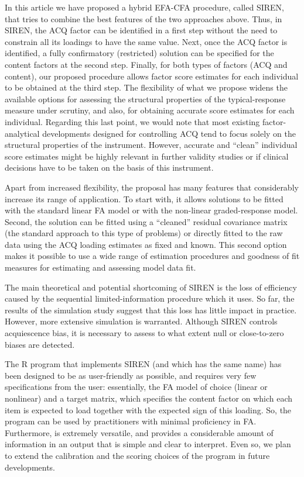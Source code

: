 In this article we have proposed a hybrid EFA-CFA procedure, called SIREN, that tries to combine the best features of the two approaches above. Thus, in SIREN, the ACQ factor can be identified in a first step without the need to constrain all its loadings to have the same value. Next, once the ACQ factor is identified, a fully confirmatory (restricted) solution can be specified for the content factors at the second step. Finally, for both types of factors (ACQ and content), our proposed procedure allows factor score estimates for each individual to be obtained at the third step. The flexibility of what we propose widens the available options for assessing the structural properties of the typical-response measure under scrutiny, and also, for obtaining accurate score estimates for each individual. Regarding this last point, we would note that most existing factor-analytical developments designed for controlling ACQ tend to focus solely on the structural properties of the instrument. However, accurate and “clean” individual score estimates might be highly relevant in further validity studies or if clinical decisions have to be taken on the basis of this instrument.

Apart from increased flexibility, the proposal has many features that considerably increase its range of application. To start with, it allows solutions to be fitted with the standard linear FA model or with the non-linear graded-response model. Second, the solution can be fitted using a “cleaned” residual covariance matrix (the standard approach to this type of problems) or directly fitted to the raw data using the ACQ loading estimates as fixed and known. This second option makes it possible to use a wide range of estimation procedures and goodness of fit measures for estimating and assessing model data fit.

The main theoretical and potential shortcoming of SIREN is the loss of efficiency caused by the sequential limited-information procedure which it uses. So far, the results of the simulation study suggest that this loss has little impact in practice. However, more extensive simulation is warranted. Although SIREN controls acquiescence bias, it is necessary to assess to what extent null or close-to-zero biases are detected.

The R program that implements SIREN (and which has the same name) has been designed to be as user-friendly as possible, and requires very few specifications from the user: essentially, the FA model of choice (linear or nonlinear) and a target matrix, which specifies the content factor on which each item is expected to load together with the expected sign of this loading. So, the program can be used by practitioners with minimal proficiency in FA. Furthermore,  is extremely versatile, and provides a considerable amount of information in an output that is simple and clear to interpret. Even so, we plan to extend the calibration and the scoring choices of the program in future
developments.

